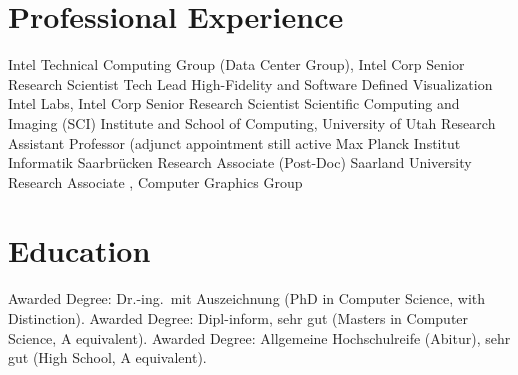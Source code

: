 \documentclass[letterpaper,11pt]{moderncv}
\begin{document}
\vspace*{-3mm}

\section{Professional Experience}
\vspace*{-1mm}
{Intel Technical Computing Group (Data Center Group), Intel Corp}
{Senior Research Scientist}
{Tech Lead 
High-Fidelity and 
Software Defined Visualization
}
{}
{}
{Intel Labs, Intel Corp}
{Senior Research Scientist}
{}
{}
{}
{Scientific Computing and Imaging
(SCI) Institute and School of Computing, University of Utah}
{Research Assistant Professor (adjunct appointment still active}
{}
{}
{}
{Max Planck Institut Informatik Saarbr\"ucken}
{Research Associate (Post-Doc)}
{}
{}
{}
{Saarland University}
{Research Associate%
, Computer Graphics Group}
{}
{}
{
}
\closesection


\vspace*{-4mm}

\section{Education}
\vspace*{-1mm}
{}{}{Awarded Degree: Dr.-ing.\ mit Auszeichnung (PhD in Computer Science, with Distinction).}
{}{}{Awarded Degree: Dipl-inform, sehr gut (Masters in Computer
  Science, A equivalent).}
{}{}{Awarded Degree: Allgemeine Hochschulreife (Abitur), sehr gut
  (High School, A equivalent).}



\vspace*{-2mm}
\end{document}
